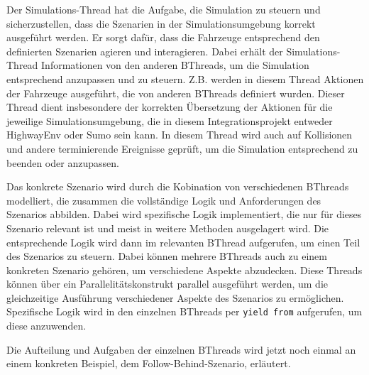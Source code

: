 Der Simulations-Thread hat die Aufgabe, die Simulation zu steuern und sicherzustellen, dass die Szenarien in der Simulationsumgebung korrekt ausgeführt werden. Er sorgt dafür, dass die Fahrzeuge entsprechend den definierten Szenarien agieren und interagieren.
Dabei erhält der Simulations-Thread Informationen von den anderen BThreads, um die Simulation entsprechend anzupassen und zu steuern. Z.B. werden in diesem Thread Aktionen der Fahrzeuge ausgeführt, die von anderen BThreads definiert wurden.
Dieser Thread dient insbesondere der korrekten Übersetzung der Aktionen für die jeweilige Simulationsumgebung, die in diesem Integrationsprojekt entweder HighwayEnv oder Sumo sein kann.
In diesem Thread wird auch auf Kollisionen und andere terminierende Ereignisse geprüft, um die Simulation entsprechend zu beenden oder anzupassen.

Das konkrete Szenario wird durch die Kobination von verschiedenen BThreads modelliert, die zusammen die vollständige Logik und Anforderungen des Szenarios abbilden. Dabei wird spezifische Logik implementiert, die nur für dieses Szenario relevant ist und meist in weitere Methoden ausgelagert wird.
Die entsprechende Logik wird dann im relevanten BThread aufgerufen, um einen Teil des Szenarios zu steuern. Dabei können mehrere BThreads auch zu einem konkreten Szenario gehören, um verschiedene Aspekte abzudecken.
Diese Threads können über ein Parallelitätskonstrukt parallel ausgeführt werden, um die gleichzeitige Ausführung verschiedener Aspekte des Szenarios zu ermöglichen. Spezifische Logik wird in den einzelnen BThreads per \texttt{yield from} aufgerufen, um diese anzuwenden.

Die Aufteilung und Aufgaben der einzelnen BThreads wird jetzt noch einmal an einem konkreten Beispiel, dem Follow-Behind-Szenario, erläutert.
